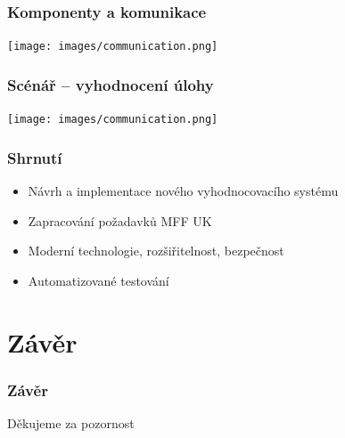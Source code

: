 \documentclass{beamer}
\begin{document}
\begin{frame}
	\frametitle{Komponenty a komunikace}
	\begin{center}
		\texttt{[image: images/communication.png]}
	\end{center}
\end{frame}

\begin{frame}
	\frametitle{Scénář -- vyhodnocení úlohy}
	\begin{center}
		\texttt{[image: images/communication.png]}
	\end{center}
\end{frame}

\begin{frame}
	\frametitle{Shrnutí}
	\begin{itemize}
		\item Návrh a implementace nového vyhodnocovacího systému
		\item Zapracování požadavků MFF UK
		\item Moderní technologie, rozšiřitelnost, bezpečnost
		\item Automatizované testování
	\end{itemize}
\end{frame}

\section{Závěr}
\begin{frame}
	\frametitle{Závěr}
	\centering
	\LARGE{Děkujeme za pozornost}
\end{frame}
\end{document}
